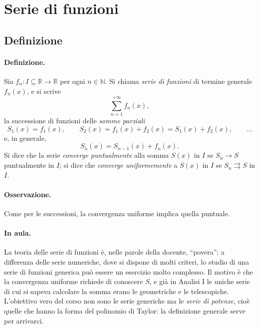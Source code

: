 
\section{Serie di funzioni}

\subsection{Definizione}

\paragraph{Definizione.} Sia $f_n:I\subseteq\mathbb{R}\to\mathbb{R}$ per ogni
$n\in\mathbb{N}$. Si chiama \emph{serie di funzioni} di termine generale $f_n(x)$, e si
scrive
\begin{equation}
\sum_{n=1}^{+\infty}f_n(x),
\end{equation}
la successione di funzioni delle \emph{somme parziali}
\begin{equation}
S_1(x)=f_1(x),\qquad S_2(x)=f_1(x)+f_2(x)=S_1(x)+f_2(x),\qquad\dots
\end{equation}
e, in generale,
\begin{equation}
S_n(x)=S_{n-1}(x)+f_n(x).
\end{equation}
Si dice che la serie \emph{converge puntualmente} alla somma $S(x)$ in $I$ se
$S_n\to S$ puntualmente in $I$; si dice che \emph{converge uniformemente} a $S(x)$ in $I$
se $S_n\rightrightarrows S$ in $I$.

\paragraph{Osservazione.} Come per le successioni, la convergenza uniforme implica quella
puntuale.

\paragraph{In aula.} La teoria delle serie di funzioni è, nelle parole della docente,
``povera'': a differenza delle serie numeriche, dove si dispone di molti criteri, lo studio
di una serie di funzioni generica può essere un esercizio molto complesso. Il motivo è che
la convergenza uniforme richiede di conoscere $S$, e già in Analisi I le uniche serie di
cui si sapeva calcolare la somma erano le geometriche e le telescopiche. L'obiettivo vero
del corso non sono le serie generiche ma le \emph{serie di potenze}, cioè quelle che hanno
la forma del polinomio di Taylor: la definizione generale serve per arrivarci.

